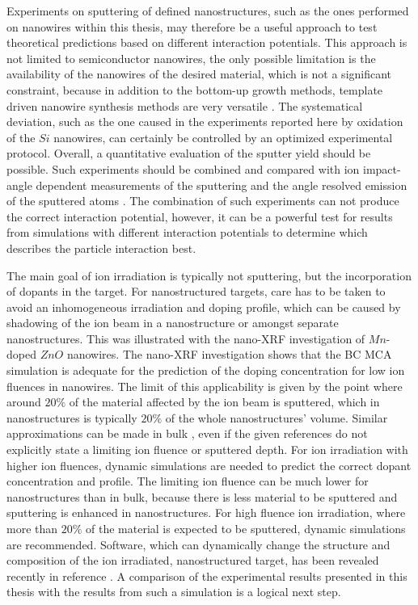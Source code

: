 Experiments on sputtering of defined nanostructures, such as the ones performed on nanowires within this thesis, may therefore be a useful approach to test theoretical predictions based on different interaction potentials. This approach is not limited to semiconductor nanowires, the only possible limitation is the availability of the nanowires of the desired material, which is not a significant constraint, because in addition to the bottom-up growth methods, template driven nanowire synthesis methods are very versatile \cite{martin_membrane-based_1996}. The systematical deviation, such as the one caused in the experiments reported here by oxidation of the $Si$ nanowires, can certainly be controlled by an optimized experimental protocol. Overall, a quantitative evaluation of the sputter yield should be possible. Such experiments should be combined and compared with ion impact-angle dependent measurements of the sputtering \cite{hofsass_simulation_2014} and the angle resolved emission of the sputtered atoms \cite{wirtz_storing_2008,verdeil_angular_2008}. The combination of such experiments can not produce the correct interaction potential, however, it can be a powerful test for results from simulations with different interaction potentials to determine which describes the particle interaction best.

The main goal of ion irradiation is typically not sputtering, but the incorporation of dopants in the target. For nanostructured targets, care has to be taken to avoid an inhomogeneous irradiation and doping profile, which can be caused by shadowing of the ion beam in a nanostructure or amongst separate nanostructures. This was illustrated with the nano-XRF investigation of $Mn$-doped $ZnO$ nanowires. The nano-XRF investigation shows that the BC MCA simulation is adequate for the prediction of the doping concentration for low ion fluences in nanowires. The limit of this applicability is given by the point where around $20\%$ of the material affected by the ion beam is sputtered, which in nanostructures is typically $20\%$ of the whole nanostructures' volume. Similar approximations can be made in bulk \cite{moller_tridyn_1984,andersen_computer_1986,moller_tridyn-binary_1988,sigmund_alloy_1993,zaporozchenko_preferential_1995}, even if the given references do not explicitly state a limiting ion fluence or sputtered depth. For ion irradiation with higher ion fluences, dynamic simulations are needed to predict the correct dopant concentration and profile. The limiting ion fluence can be much lower for nanostructures than in bulk, because there is less material to be sputtered and sputtering is enhanced in nanostructures. For high fluence ion irradiation, where more than $20\%$ of the material is expected to be sputtered, dynamic simulations are recommended. Software, which can dynamically change the structure and composition of the ion irradiated, nanostructured target, has been revealed recently in reference \cite{moller_tri3dyn_2014}. A comparison of the experimental results presented in this thesis with the results from such a simulation is a logical next step.

